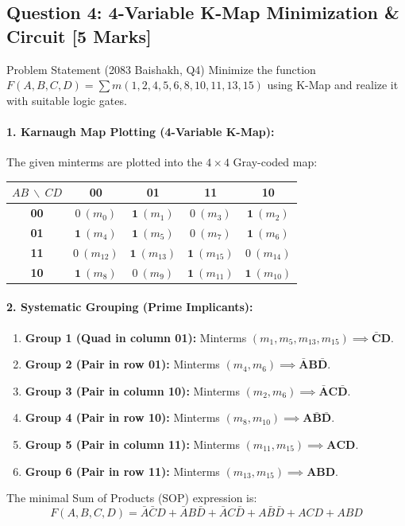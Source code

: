 \documentclass[11pt,a4paper,oneside]{book}
\begin{document}
\subsection{Question 4: 4-Variable K-Map Minimization \& Circuit [5 Marks]}
\begin{questionbox}{Problem Statement (2083 Baishakh, Q4)}
Minimize the function $F(A, B, C, D) = \sum m(1, 2, 4, 5, 6, 8, 10, 11, 13, 15)$ using K-Map and realize it with suitable logic gates.
\end{questionbox}

\paragraph{1. Karnaugh Map Plotting (4-Variable K-Map):}
The given minterms are plotted into the $4 \times 4$ Gray-coded map:
\begin{center}
\begin{tabular}{|c|c|c|c|c|}
\hline
$AB \ \backslash \ CD$ & \textbf{00} & \textbf{01} & \textbf{11} & \textbf{10} \\ \hline
\textbf{00} & $0\ (m_0)$ & $\mathbf{1}\ (m_1)$ & $0\ (m_3)$ & $\mathbf{1}\ (m_2)$ \\ \hline
\textbf{01} & $\mathbf{1}\ (m_4)$ & $\mathbf{1}\ (m_5)$ & $0\ (m_7)$ & $\mathbf{1}\ (m_6)$ \\ \hline
\textbf{11} & $0\ (m_{12})$ & $\mathbf{1}\ (m_{13})$ & $\mathbf{1}\ (m_{15})$ & $0\ (m_{14})$ \\ \hline
\textbf{10} & $\mathbf{1}\ (m_8)$ & $0\ (m_9)$ & $\mathbf{1}\ (m_{11})$ & $\mathbf{1}\ (m_{10})$ \\ \hline
\end{tabular}
\end{center}

\paragraph{2. Systematic Grouping (Prime Implicants):}
\begin{enumerate}
  \item \textbf{Group 1 (Quad in column 01):} Minterms $(m_1, m_5, m_{13}, m_{15}) \implies \mathbf{\bar{C}D}$.
  \item \textbf{Group 2 (Pair in row 01):} Minterms $(m_4, m_6) \implies \mathbf{\bar{A}B\bar{D}}$.
  \item \textbf{Group 3 (Pair in column 10):} Minterms $(m_2, m_6) \implies \mathbf{\bar{A}C\bar{D}}$.
  \item \textbf{Group 4 (Pair in row 10):} Minterms $(m_8, m_{10}) \implies \mathbf{A\bar{B}\bar{D}}$.
  \item \textbf{Group 5 (Pair in column 11):} Minterms $(m_{11}, m_{15}) \implies \mathbf{ACD}$.
  \item \textbf{Group 6 (Pair in row 11):} Minterms $(m_{13}, m_{15}) \implies \mathbf{ABD}$.
\end{enumerate}
The minimal Sum of Products (SOP) expression is:
\[
F(A,B,C,D) = \bar{A}\bar{C}D + \bar{A}B\bar{D} + \bar{A}C\bar{D} + A\bar{B}\bar{D} + ACD + ABD
\]
\end{document}
